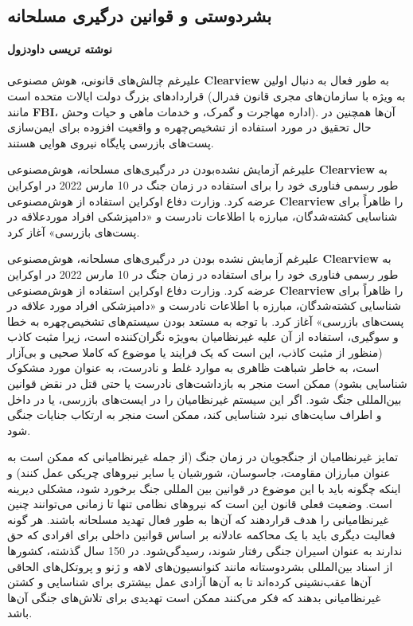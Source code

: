 {
\subsection*{بشردوستی و قوانین درگیری مسلحانه}
\label{subsec:بشردوستی و قوانین درگیری مسلحانه}
\noindent \textbf{نوشته تریسی داودزول}
\\\\
علیرغم چالش‌های قانونی، هوش مصنوعی \textenglish{\textbf{Clearview}} به طور فعال به دنبال اولین قراردادهای بزرگ دولت ایالات متحده است (به ویژه با سازمان‌های مجری قانون فدرال مانند \textenglish{\textbf{FBI}}، اداره مهاجرت و گمرک، و خدمات ماهی و حیات وحش). آن‌ها همچنین در حال تحقیق در مورد استفاده از تشخیص‌چهره و واقعیت افزوده برای ایمن‌سازی پست‌های بازرسی پایگاه نیروی هوایی هستند.
}

علیرغم آزمایش نشده‌بودن در درگیری‌های مسلحانه، هوش‌مصنوعی \textenglish{\textbf{Clearview}} به طور رسمی فناوری خود را برای استفاده در زمان جنگ در 10 مارس 2022 در اوکراین عرضه کرد.
وزارت دفاع اوکراین استفاده از هوش‌مصنوعی \textenglish{\textbf{Clearview}} را ظاهراً برای شناسایی کشته‌شدگان، مبارزه با اطلاعات نادرست و «دامپزشکی افراد مورد‌علاقه در پست‌های بازرسی» آغاز کرد.

علیرغم آزمایش نشده بودن در درگیری‌های مسلحانه، هوش‌مصنوعی \textenglish{\textbf{Clearview}} به طور رسمی فناوری خود را برای استفاده در زمان جنگ در 10 مارس 2022 در اوکراین عرضه کرد.
وزارت دفاع اوکراین استفاده از هوش‌مصنوعی \textenglish{\textbf{Clearview}} را ظاهراً برای شناسایی کشته‌شدگان، مبارزه با اطلاعات نادرست و «دامپزشکی افراد مورد علاقه در پست‌های بازرسی» آغاز کرد.
با توجه به مستعد بودن سیستم‌های تشخیص‌چهره به خطا و سوگیری، استفاده از آن علیه غیرنظامیان به‌ویژه نگران‌کننده است، زیرا مثبت کاذب (منظور از مثبت کاذب، این است که یک فرایند یا موضوع که کاملا صحیی و بی‌آزار است، به خاطر شباهت ظاهری به موارد غلط و نادرست، به عنوان مورد مشکوک شناسایی بشود) ممکن است منجر به بازداشت‌های نادرست یا حتی قتل در نقض قوانین بین‌المللی جنگ شود.
اگر این سیستم غیرنظامیان را در ایست‌های بازرسی، یا در داخل و اطراف سایت‌های نبرد شناسایی کند، ممکن است منجر به ارتکاب جنایات جنگی شود.

تمایز غیرنظامیان از جنگجویان در زمان جنگ (از جمله غیرنظامیانی که ممکن است به عنوان مبارزان مقاومت، جاسوسان، شورشیان یا سایر نیروهای چریکی عمل کنند) و اینکه چگونه باید با این موضوع در قوانین بین المللی جنگ برخورد شود، مشکلی دیرینه است.
وضعیت فعلی قانون این است که نیروهای نظامی تنها تا زمانی می‌توانند چنین غیرنظامیانی را هدف قرار‌دهند که آن‌ها به طور فعال تهدید مسلحانه باشند.
هر گونه فعالیت دیگری باید با یک محاکمه عادلانه بر اساس قوانین داخلی برای افرادی که حق ندارند به عنوان اسیران جنگی رفتار شوند، رسیدگی‌شود.
در 150 سال گذشته، کشورها از اسناد بین‌المللی بشردوستانه مانند کنوانسیون‌های لاهه و ژنو و پروتکل‌های الحاقی آن‌ها عقب‌نشینی کرده‌اند تا به آن‌ها آزادی عمل بیشتری برای شناسایی و کشتن غیرنظامیانی بدهند که فکر می‌کنند ممکن است تهدیدی برای تلاش‌های جنگی آن‌ها باشد.

